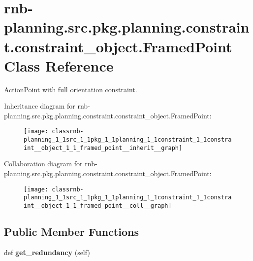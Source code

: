 \hypertarget{classrnb-planning_1_1src_1_1pkg_1_1planning_1_1constraint_1_1constraint__object_1_1_framed_point}{}\section{rnb-\/planning.src.\+pkg.\+planning.\+constraint.\+constraint\+\_\+object.\+Framed\+Point Class Reference}
\label{classrnb-planning_1_1src_1_1pkg_1_1planning_1_1constraint_1_1constraint__object_1_1_framed_point}


Action\+Point with full orientation constraint.  




Inheritance diagram for rnb-\/planning.src.\+pkg.\+planning.\+constraint.\+constraint\+\_\+object.\+Framed\+Point\+:
\nopagebreak
\begin{figure}[H]
\begin{center}
\leavevmode
\texttt{[image: classrnb-planning\_1\_1src\_1\_1pkg\_1\_1planning\_1\_1constraint\_1\_1constraint\_\_object\_1\_1\_framed\_point\_\_inherit\_\_graph]}
\end{center}
\end{figure}


Collaboration diagram for rnb-\/planning.src.\+pkg.\+planning.\+constraint.\+constraint\+\_\+object.\+Framed\+Point\+:
\nopagebreak
\begin{figure}[H]
\begin{center}
\leavevmode
\texttt{[image: classrnb-planning\_1\_1src\_1\_1pkg\_1\_1planning\_1\_1constraint\_1\_1constraint\_\_object\_1\_1\_framed\_point\_\_coll\_\_graph]}
\end{center}
\end{figure}
\subsection*{Public Member Functions}
\begin{DoxyCompactItemize}
\item 
\mbox{\label{classrnb-planning_1_1src_1_1pkg_1_1planning_1_1constraint_1_1constraint__object_1_1_framed_point_ab912d6c12a355a4f0f7365aa5cb28543}} 
def {\bfseries get\+\_\+redundancy} (self)
\end{DoxyCompactItemize}
